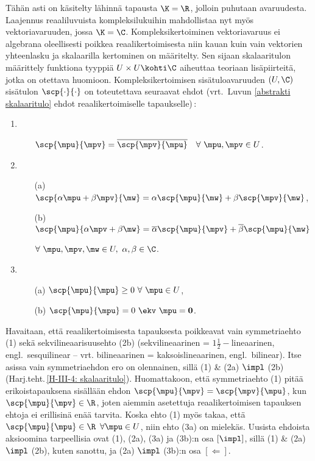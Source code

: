Tähän asti on käsitelty lähinnä tapausta $\K = \R$, jolloin puhutaan  
avaruudesta. Laajennus reaaliluvuista kompleksilukuihin mahdollistaa nyt myös 
 vektoriavaruuden, jossa $\K = \C$. Kompleksikertoiminen 
vektoriavaruus ei algebrana oleellisesti poikkea reaalikertoimisesta niin kauan kuin vain 
vektorien yhteenlasku ja skalaarilla kertominen on määritelty. Sen sijaan skalaaritulon 
määrittely funktiona tyyppiä $U \times U \kohti \C$ aiheuttaa teoriaan lisäpiirteitä, jotka on
otettava huomioon. Kompleksikertoimisen sisätuloavaruuden $(U, \C)$ sisätulon 
$\scp{\cdot}{\cdot}$ on toteutettava seuraavat ehdot (vrt.\ Luvun \ref{abstrakti skalaaritulo}
ehdot reaalikertoimiselle tapaukselle)\,:
\begin{enumerate}
\item {}
\begin{itemize}
\item[] $\scp{\mpu}{\mpv}=\overline{\scp{\mpv}{\mpu}} \quad \forall \ \mpu,\mpv \in U$.
\end{itemize}
\item {} 
\begin{itemize}
\item[(a)] $\scp{\alpha \mpu + \beta \mpv}{\mw} = \alpha \scp{\mpu}{\mw} 
                                                                + \beta \scp{\mpv}{\mw}$,
\item[(b)] $\scp{\mpu}{\alpha \mpv + \beta \mw} = \overline{\alpha} \scp{\mpu}{\mpv} 
                                                        + \overline{\beta} \scp{\mpu}{\mw}$
\item[] \qquad\qquad $\forall \ \mpu, \mpv, \mw \in U,\ \alpha, \beta \in \C$.
\end{itemize}
\item {} 
\begin{itemize}
\item[(a)] $\scp{\mpu}{\mpu} \geq 0 \ \forall \ \mpu \in U$,
\item[(b)] $\scp{\mpu}{\mpu} = 0 \ \ekv \ \mpu = \mathbf{0}$.
\end{itemize}
\end{enumerate}
Havaitaan, että reaalikertoimisesta tapauksesta poikkeavat vain symmetriaehto (1) sekä 
sekvilineaarisuusehto (2b) (sekvilineaarinen = $1\frac{1}{2}-$lineaarinen, engl.\ sesquilinear 
-- vrt. bilineaarinen = kaksoislineaarinen, engl.\ bilinear). Itse asissa vain symmetriaehdon
ero on olennainen, sillä (1) \& (2a) $\impl$ (2b) (Harj.teht.\,\ref{H-III-4: skalaaritulo}).
Huomattakoon, että symmetriaehto (1) pitää erikoistapauksena sisällään ehdon
$\scp{\mpu}{\mpv} = \scp{\mpv}{\mpu}$, kun $\scp{\mpu}{\mpv} \in \R$, joten aiemmin asetettuja
reaalikertoimisen tapauksen ehtoja ei erillisinä enää tarvita. Koska ehto (1) myös takaa, että 
$\scp{\mpu}{\mpu}\in\R\,\ \forall \mpu \in U$, niin ehto (3a) on mielekäs. Uusista ehdoista
aksioomina tarpeellisia ovat (1), (2a), (3a) ja (3b):n osa $[\impl]$, sillä (1) \& (2a)
$\impl$ (2b), kuten sanottu, ja (2a) $\impl$ (3b):n osa $[\Leftarrow]$.

